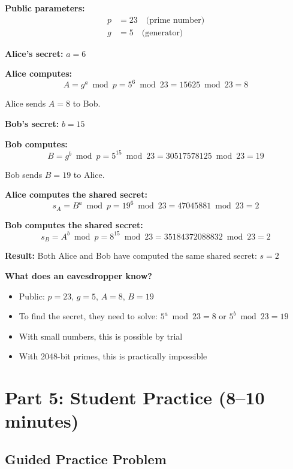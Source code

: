 \documentclass[11pt]{article}
\begin{document}
\textbf{Public parameters:}
\begin{align*}
p &= 23 \quad \text{(prime number)} \\
g &= 5 \quad \text{(generator)}
\end{align*}

\textbf{Alice's secret:} $a = 6$

\textbf{Alice computes:}
\[
A = g^a \bmod p = 5^6 \bmod 23 = 15625 \bmod 23 = 8
\]

Alice sends $A = 8$ to Bob.

\vspace{0.3cm}

\textbf{Bob's secret:} $b = 15$

\textbf{Bob computes:}
\[
B = g^b \bmod p = 5^{15} \bmod 23 = 30517578125 \bmod 23 = 19
\]

Bob sends $B = 19$ to Alice.

\vspace{0.3cm}

\textbf{Alice computes the shared secret:}
\[
s_A = B^a \bmod p = 19^6 \bmod 23 = 47045881 \bmod 23 = 2
\]

\textbf{Bob computes the shared secret:}
\[
s_B = A^b \bmod p = 8^{15} \bmod 23 = 35184372088832 \bmod 23 = 2
\]

\textbf{Result:} Both Alice and Bob have computed the same shared secret: $s = 2$

\vspace{0.3cm}

\textbf{What does an eavesdropper know?}
\begin{itemize}
    \item Public: $p = 23$, $g = 5$, $A = 8$, $B = 19$
    \item To find the secret, they need to solve: $5^a \bmod 23 = 8$ or $5^b \bmod 23 = 19$
    \item With small numbers, this is possible by trial
    \item With 2048-bit primes, this is practically impossible
\end{itemize}

\section{Part 5: Student Practice (8--10 minutes)}

\subsection*{Guided Practice Problem}
\end{document}
